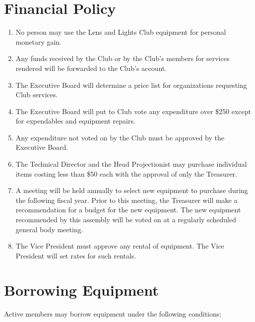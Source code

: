 \documentclass[12pt,letterpaper,oneside]{book}
\begin{document}
\section{Financial Policy}

\begin{enumerate}

\item No person may use the Lens and Lights Club equipment for personal monetary gain.
\item Any funds received by the Club or by the Club's members for services rendered will be forwarded to the Club's account.
\item The Executive Board will determine a price list for organizations requesting Club services.
\item The Executive Board will put to Club vote any expenditure over \$250 except for expendables and equipment repairs.
\item Any expenditure not voted on by the Club must be approved by the Executive Board.
\item The Technical Director and the Head Projectionist may purchase individual items costing less than \$50 each with the approval of only the Treasurer.
\item A meeting will be held annually to select new equipment to purchase during the following fiscal year. Prior to this meeting, the Treasurer will make a recommendation for a budget for the new equipment. The new equipment recommended by this assembly will be voted on at a regularly scheduled general body meeting.
\item The Vice President must approve any rental of equipment. The Vice President will set rates for such rentals.

\end{enumerate}

\section{Borrowing Equipment}

Active members may borrow equipment under the following conditions:
\end{document}
